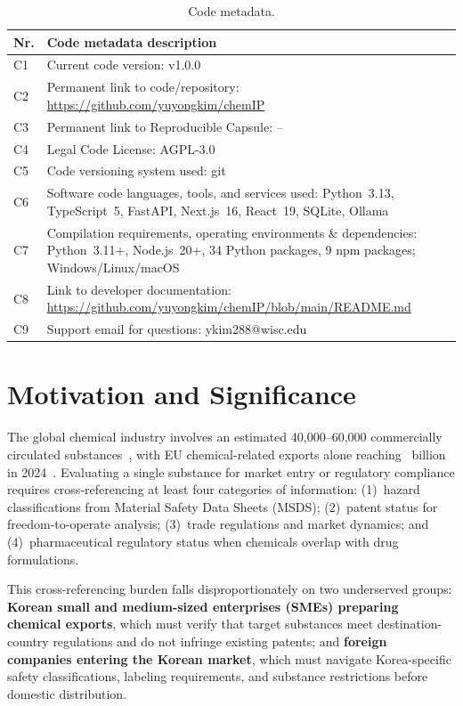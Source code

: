 \documentclass[preprint,12pt]{elsarticle}
\begin{document}
\begin{table}[H]
\caption{Code metadata.}
\label{tab:code_metadata}
\small
\begin{tabular}{@{}lp{9cm}@{}}
\toprule
\textbf{Nr.} & \textbf{Code metadata description} \\
\midrule
C1 & Current code version: v1.0.0 \\
C2 & Permanent link to code/repository: \url{https://github.com/yuyongkim/chemIP} \\
C3 & Permanent link to Reproducible Capsule: -- \\
C4 & Legal Code License: AGPL-3.0 \\
C5 & Code versioning system used: git \\
C6 & Software code languages, tools, and services used: Python~3.13, TypeScript~5, FastAPI, Next.js~16, React~19, SQLite, Ollama \\
C7 & Compilation requirements, operating environments \& dependencies: Python~3.11+, Node.js~20+, 34 Python packages, 9 npm packages; Windows/Linux/macOS \\
C8 & Link to developer documentation: \url{https://github.com/yuyongkim/chemIP/blob/main/README.md} \\
C9 & Support email for questions: ykim288@wisc.edu \\
\bottomrule
\end{tabular}
\end{table}

\section{Motivation and Significance}
\label{sec:motivation}

The global chemical industry involves an estimated 40,000--60,000 commercially circulated substances~\cite{icca_overview}, with EU chemical-related exports alone reaching ~billion in 2024~\cite{eurostat_chemicals}.
Evaluating a single substance for market entry or regulatory compliance requires cross-referencing at least four categories of information: (1)~hazard classifications from Material Safety Data Sheets (MSDS); (2)~patent status for freedom-to-operate analysis; (3)~trade regulations and market dynamics; and (4)~pharmaceutical regulatory status when chemicals overlap with drug formulations.

This cross-referencing burden falls disproportionately on two underserved groups: \textbf{Korean small and medium-sized enterprises (SMEs) preparing chemical exports}, which must verify that target substances meet destination-country regulations and do not infringe existing patents; and \textbf{foreign companies entering the Korean market}, which must navigate Korea-specific safety classifications, labeling requirements, and substance restrictions before domestic distribution.
\end{document}
